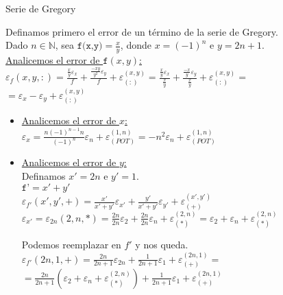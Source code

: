 \documentclass[12pt,titlepage]{article}
\newcommand{\func}[2]{\texttt{#1}(#2)}
\newcommand{\funcFull}[2]{\texttt{#1}=#2}
\newcommand{\e}[2]{\varepsilon _{#1}({#2})}
\newcommand{\er}[2]{\varepsilon _{({#1})}^{({#2})}}
\newcommand{\ev}[1]{\varepsilon _{#1}}
\newcommand{\N}{\mathbb{N}}
\begin{document}
	\begin{section}{Serie de Gregory}

		\large
		
		Definamos primero el error de un término de la serie de Gregory.\\

		Dado $n \in \N$, sea $\funcFull{f(x,y)} {\frac{x}{y}}$, donde $x=(-1)^n$ e $y=2n+1$.\\
		
		\underline{Analicemos el error de $\func{f}{x,y}$:}\\
		
		$\funcFull{$\e{f}{x,y,:}$}{\frac{\frac{x}{y}\ev{x}}{f} + \frac{\frac{-xy}{y^2}\ev{y}}{f} + \er{:}{x,y}} = 
		\frac{\frac{x}{y}\ev{x}}{\frac{x}{y}} + \frac{\frac{-x}{y}\ev{y}}{\frac{x}{y}} + \er{:}{x,y} =$\\
		
		 $= \ev{x} - \ev{y} + \er{:}{x,y}$\\
		
		\begin{itemize}
		\item \underline{Analicemos el error de $x$:}\\
		
		$\funcFull{$\ev{x}$}{\frac{n(-1)^{n-1}n}{(-1)^n}\ev{n} + \er{POT}{1,n}} = -n^2\ev{n} + \er{POT}{1,n}$\\
		
		\item \underline{Analicemos el error de $y$:}\\
		
		Definamos $x' = 2n$ e $y'=1$.\\
		
		$\funcFull{f'}{x'+y'}$\\
		
		$\e{f'}{x',y',+} = \frac{x'}{x'+y'}\ev{x'} + \frac{y'}{x'+y'}\ev{y'} + \er{+}{x',y'}$\\
		
		$\ev{x'} = \e{2n}{2,n,*} = \frac{2n}{2n}\ev{2} + \frac{2n}{2n}\ev{n} + \er{*}{2,n} = \ev{2} + \ev{n} + \er{*}{2,n}$
		\newpage
		
		Podemos reemplazar en $f'$ y nos queda.\\
		
		$\e{f'}{2n,1,+} = \frac{2n}{2n+1}\ev{2n} + \frac{1}{2n+1}\ev{1} + \er{+}{2n,1} =$\\
		
		$= \frac{2n}{2n+1}(\ev{2} + \ev{n} + \er{*}{2,n}) + \frac{1}{2n+1}\ev{1} + \er{+}{2n,1}$\\
		\end{itemize}
		

\end{section}
\end{document}
